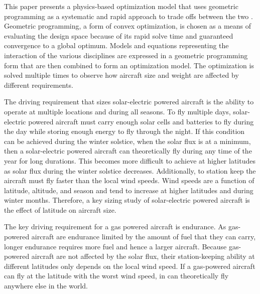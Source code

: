 This paper presents a physics-based optimization model that uses geometric programming as a systematic and rapid approach to \DIFdelbegin {}\DIFdelend \DIFaddbegin {}\DIFaddend trade offs between the two \DIFdelbegin {}\DIFdelend \DIFaddbegin {}\DIFaddend .  Geometric programming, a form of convex optimization, is chosen as a means of evaluating the design space because of its rapid solve time and guaranteed convergence to a global optimum.\cite{gp}
Models and equations representing the interaction of the various disciplines are expressed in a geometric programming form that are then combined to form an optimization model. 
The optimization is solved multiple times \DIFdelbegin {}\DIFdelend to observe how aircraft size and weight are affected by different \DIFaddbegin {}\DIFaddend requirements. 

The driving requirement that sizes solar-electric powered aircraft is the ability to operate at multiple locations and during all seasons.  
To fly multiple days, solar-electric powered aircraft must carry enough solar cells and batteries to fly during the day while storing enough energy to fly through the night.\cite{solartech}
If this condition can be achieved during the winter solstice, when the solar flux is at a minimum, then a solar-electric powered aircraft can theoretically fly during any time of the year for long durations. \cite{solartech}
This becomes more difficult to achieve at higher latitudes as solar flux during the winter solstice decreases.  
Additionally, to station keep the aircraft must fly faster than the local wind speeds.  
Wind speeds are a function of latitude, altitude, and season and tend to increase at higher latitudes and during winter months. 
Therefore, a key sizing study of solar-electric powered aircraft is the effect of latitude on aircraft size.  

The key driving requirement for a gas powered aircraft is endurance.  
As gas-powered aircraft are endurance limited by the amount of fuel that they can carry, longer endurance requires more fuel and hence a larger aircraft.  
Because gas-powered aircraft are not affected by the solar flux, their station-keeping ability at different latitudes only depends on the local wind speed. 
If a gas-powered aircraft can fly at the latitude with the worst wind speed, in can theoretically fly anywhere else in the world.  

